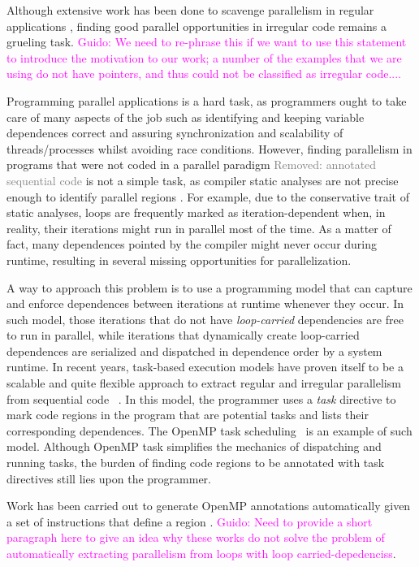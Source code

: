 \documentclass[sigplan,10pt,review,anonymous]{acmart}
\newcommand{\guido}[1]{\noindent\textcolor{magenta}{Guido: {#1}}}
\newcommand{\rmv}[1]{\noindent\textcolor{gray}{Removed: {#1}}}
\newcommand{\guido}[1]{}
\newcommand{\rmv}[1]{}
\begin{document}
Although extensive  work has been done to scavenge parallelism in regular applications \cite{kulkarni2009much}, finding good  parallel opportunities in irregular code remains a grueling task. \guido{We need to re-phrase this if we want to use this statement to introduce the motivation to our work; a number of the examples that we are using do not have pointers, and thus could not be classified as irregular code....} 

Programming parallel applications is a hard task, as programmers ought to take care of many aspects of the job such as identifying and keeping variable dependences correct and assuring synchronization and scalability of threads/processes whilst avoiding race conditions. However, finding parallelism in programs that were not coded in a parallel paradigm \rmv{annotated sequential  code} is not a simple task, as compiler static analyses are not precise enough to identify  parallel regions \cite{kulkarni2007optimistic}. For example, due  to the conservative trait of static analyses, loops are frequently marked as iteration-dependent when, in reality, their iterations might run in parallel most of the time. As a matter of fact,  many dependences pointed by the compiler might never occur during runtime, resulting in several missing opportunities for parallelization.

A way to approach this problem is to use a programming model that can capture and enforce dependences between iterations at runtime whenever they occur. In such model, those iterations that do not have {\it loop-carried} dependencies are free to run in parallel, while iterations that dynamically create loop-carried dependences are serialized and dispatched in dependence order by  a system runtime.  In recent years, task-based execution models  have proven itself to be a scalable and quite flexible approach to extract regular and irregular parallelism from sequential code ~\cite{starss,bddt,cilk,sequoia,dandelion,legion,ooojava,dague}. In this model, the programmer uses a {\it task} directive to mark  code regions in the program that are potential tasks and lists their corresponding dependences.  The OpenMP task scheduling~\cite{openmp2009}  is an example of such model. Although OpenMP task simplifies the mechanics of dispatching and running tasks, the burden of finding code regions to be annotated with task directives still lies upon the programmer.

Work has been carried out to generate OpenMP annotations automatically given a set of instructions that define  a region \cite{gleison2016, pingali2011tao, wanggenerating}. \guido{Need to provide a short paragraph here to give an idea why these works do not solve the problem of automatically extracting parallelism from loops with loop carried-depedenciss}.
\end{document}
